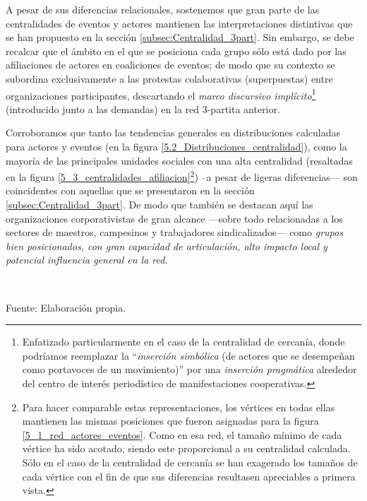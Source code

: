 \documentclass[letterpaper, 11pt]{book}
\theoremstyle{definition}
\theoremstyle{remark}
\begin{document}
A pesar de sus diferencias relacionales, sostenemos que gran parte de las centralidades de eventos y actores mantienen las interpretaciones distintivas que se han propuesto en la sección \ref{subsec:Centralidad_3part}. 
Sin embargo, se debe recalcar que el ámbito en el que se posiciona cada grupo sólo está dado por las afiliaciones de actores en coaliciones de eventos; de modo que su contexto se subordina exclusivamente a las protestas colaborativas (superpuestas) entre organizaciones participantes, descartando el \emph{marco discursivo implícito}\footnote{
    Enfatizado particularmente en el caso de la centralidad de cercanía, donde podríamos reemplazar la ``\emph{inserción simbólica} (de actores que se desempeñan como portavoces de un movimiento)'' por una \emph{inserción pragmática} alrededor del centro de interés periodístico de manifestaciones cooperativas. 
} (introducido junto a las demandas) en la red 3-partita anterior. 


Corroboramos que tanto las tendencias generales en distribuciones calculadas para actores y eventos (en la figura \ref{5.2_Distribuciones_centralidad}), como la mayoría de las principales unidades sociales con una alta centralidad (resaltadas en la figura \ref{5_3_centralidades_afiliacion}\footnote{
    Para hacer comparable estas representaciones, los vértices en todas ellas mantienen las mismas posiciones que fueron asignadas para la figura \ref{5_1_red_actores_eventos}. 
    Como en esa red, el tamaño mínimo de cada vértice ha sido acotado, siendo este proporcional a su centralidad calculada. 
    Sólo en el caso de la centralidad de cercanía se han exagerado los tamaños de cada vértice con el fin de que sus diferencias resultasen apreciables a primera vista. 
}) 
--a pesar de ligeras diferencias--- son coincidentes con aquellas que se presentaron en la sección \ref{subsec:Centralidad_3part}. 
De modo que también se destacan aquí las organizaciones corporativistas de gran alcance ---sobre todo relacionadas a los sectores de maestros, campesinos y trabajadores sindicalizados--- como \emph{grupos bien posicionados, con gran capacidad de articulación, alto impacto local y potencial influencia general en la red}. 


\pagebreak
\hspace{-1.5em} \begin{minipage}{\linewidth}
\centering\bigskip
{} \label{5_3_centralidades_afiliacion}

\includegraphics[scale=0.1]{img/null.png}
\vspace{45em}
\par\bigskip
\small Fuente: Elaboración propia.
\end{minipage}\bigskip
\end{document}
